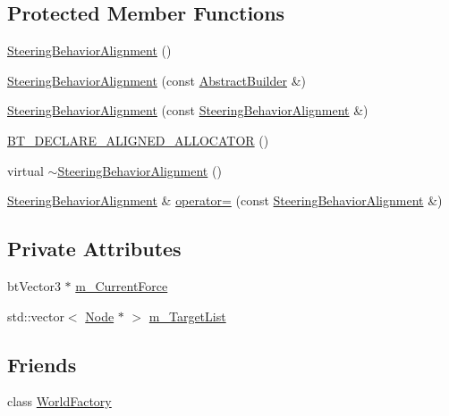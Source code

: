 \subsection*{Protected Member Functions}
\begin{DoxyCompactItemize}
\item 
\mbox{\hyperlink{classnjli_1_1_steering_behavior_alignment_a3040f00d20496d47bda30af6a9878dc5}{Steering\+Behavior\+Alignment}} ()
\item 
\mbox{\hyperlink{classnjli_1_1_steering_behavior_alignment_a71ecfd6cde46f132a2d16af9e13f694f}{Steering\+Behavior\+Alignment}} (const \mbox{\hyperlink{classnjli_1_1_abstract_builder}{Abstract\+Builder}} \&)
\item 
\mbox{\hyperlink{classnjli_1_1_steering_behavior_alignment_af6172ece292e73d5d4f5ad0b9e0f1b91}{Steering\+Behavior\+Alignment}} (const \mbox{\hyperlink{classnjli_1_1_steering_behavior_alignment}{Steering\+Behavior\+Alignment}} \&)
\item 
\mbox{\hyperlink{classnjli_1_1_steering_behavior_alignment_ac9f41d5cd2c2e729d0a11776dfdfa5a1}{B\+T\+\_\+\+D\+E\+C\+L\+A\+R\+E\+\_\+\+A\+L\+I\+G\+N\+E\+D\+\_\+\+A\+L\+L\+O\+C\+A\+T\+OR}} ()
\item 
virtual \mbox{\hyperlink{classnjli_1_1_steering_behavior_alignment_afdd370f7624c7af4f0240ce2984aa1de}{$\sim$\+Steering\+Behavior\+Alignment}} ()
\item 
\mbox{\hyperlink{classnjli_1_1_steering_behavior_alignment}{Steering\+Behavior\+Alignment}} \& \mbox{\hyperlink{classnjli_1_1_steering_behavior_alignment_a2ebd44d4aed19a49157962658c5c49b6}{operator=}} (const \mbox{\hyperlink{classnjli_1_1_steering_behavior_alignment}{Steering\+Behavior\+Alignment}} \&)
\end{DoxyCompactItemize}
\subsection*{Private Attributes}
\begin{DoxyCompactItemize}
\item 
bt\+Vector3 $\ast$ \mbox{\hyperlink{classnjli_1_1_steering_behavior_alignment_aa0ff4a6faf13f61bc0c98884ec777960}{m\+\_\+\+Current\+Force}}
\item 
std\+::vector$<$ \mbox{\hyperlink{classnjli_1_1_node}{Node}} $\ast$ $>$ \mbox{\hyperlink{classnjli_1_1_steering_behavior_alignment_a602bca83019d945502324777d7243dfd}{m\+\_\+\+Target\+List}}
\end{DoxyCompactItemize}
\subsection*{Friends}
\begin{DoxyCompactItemize}
\item 
class \mbox{\hyperlink{classnjli_1_1_steering_behavior_alignment_acb96ebb09abe8f2a37a915a842babfac}{World\+Factory}}
\end{DoxyCompactItemize}
